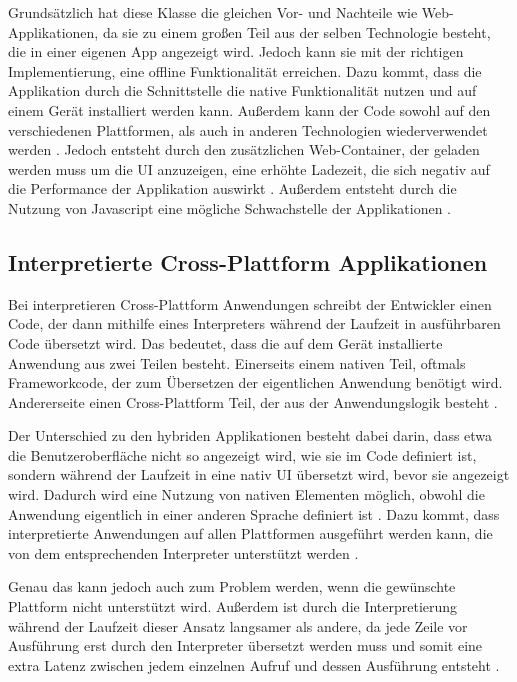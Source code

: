 Grundsätzlich hat diese Klasse die gleichen Vor- und Nachteile wie Web-Applikationen, da sie zu einem großen Teil aus der selben Technologie besteht, die in einer eigenen App angezeigt wird. Jedoch kann sie mit der richtigen Implementierung, eine offline Funktionalität erreichen. Dazu kommt, dass die Applikation durch die Schnittstelle die native Funktionalität nutzen und auf einem Gerät installiert werden kann. Außerdem kann der Code sowohl auf den verschiedenen Plattformen, als auch in anderen Technologien wiederverwendet werden \cite{IEEE_development_classes}. Jedoch entsteht durch den zusätzlichen Web-Container, der geladen werden muss um die UI anzuzeigen, eine erhöhte Ladezeit, die sich negativ auf die Performance der Applikation auswirkt \cite{IEEE_development_classes}. Außerdem entsteht durch die Nutzung von Javascript eine mögliche Schwachstelle der Applikationen \cite{javascript_dangerous}. 

\subsection{Interpretierte Cross-Plattform Applikationen}
Bei interpretieren Cross-Plattform Anwendungen schreibt der Entwickler einen Code, der dann mithilfe eines Interpreters während der Laufzeit in ausführbaren Code übersetzt wird. Das bedeutet, dass die auf dem Gerät installierte Anwendung aus zwei Teilen besteht. Einerseits einem nativen Teil, oftmals Frameworkcode, der zum Übersetzen der eigentlichen Anwendung benötigt wird. Andererseite einen Cross-Plattform Teil, der aus der Anwendungslogik besteht \cite{IEEE_development_classes}.

Der Unterschied zu den hybriden Applikationen besteht dabei darin, dass etwa die Benutzeroberfläche nicht so angezeigt wird, wie sie im Code definiert ist, sondern während der Laufzeit in eine nativ \ac{UI} übersetzt wird, bevor sie angezeigt wird. Dadurch wird eine Nutzung von nativen Elementen möglich, obwohl die Anwendung eigentlich in einer anderen Sprache definiert ist \cite{IEEE_development_classes}. Dazu kommt, dass interpretierte Anwendungen auf allen Plattformen ausgeführt werden kann, die von dem entsprechenden Interpreter unterstützt werden \cite{server_side}.

Genau das kann jedoch auch zum Problem werden, wenn die gewünschte Plattform nicht unterstützt wird. Außerdem ist durch die Interpretierung während der Laufzeit dieser Ansatz langsamer als andere, da jede Zeile vor Ausführung erst durch den Interpreter übersetzt werden muss und somit eine extra Latenz zwischen jedem einzelnen Aufruf und dessen Ausführung entsteht \cite{server_side}.


